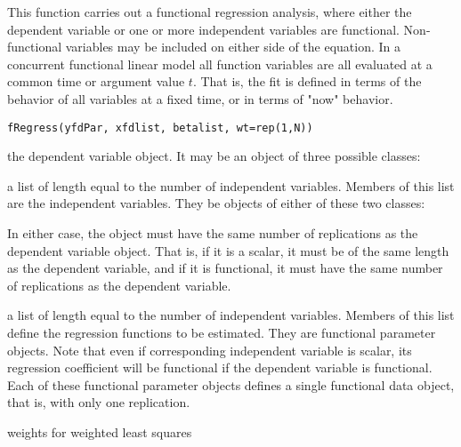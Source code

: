 \documentclass{article}
\begin{document}
\begin{Description}\relax
This function carries out a functional regression analysis,
where either the dependent variable or one or more
independent variables are functional.  Non-functional variables
may be included on either side of the equation.  In a concurrent
functional linear model all function variables are all evaluated at
a common time or argument value $t$.   That is, the fit is
defined in terms of the behavior of all variables at a fixed time,
or in terms of "now" behavior.
\end{Description}
\begin{Usage}
\begin{verbatim}
fRegress(yfdPar, xfdlist, betalist, wt=rep(1,N))
\end{verbatim}
\end{Usage}
\begin{Arguments}
\begin{ldescription}
\item[\code{yfdPar}] the dependent variable object.  It may be an object of
three possible classes:

\item[\code{xfdlist}] a list of length equal to the number of independent variables. Members
of this list are the independent variables.  They be objects of either
of these two classes:


In either case, the object must have the same number of replications as
the dependent variable object.  That is, if it is a scalar, it must be
of the same length as the dependent variable, and if it is functional,
it must have the same number of replications as the dependent variable.

\item[\code{betalist}] a list of length equal to the number of independent variables. Members
of this list define the regression functions to be estimated.
They are functional parameter objects.  Note that even if corresponding
independent variable is scalar, its regression coefficient will be
functional if the dependent variable is functional.  Each of these
functional parameter objects defines a single functional data object,
that is, with only one replication.

\item[\code{wt}] weights for weighted least squares 

\end{ldescription}
\end{Arguments}
\end{document}
